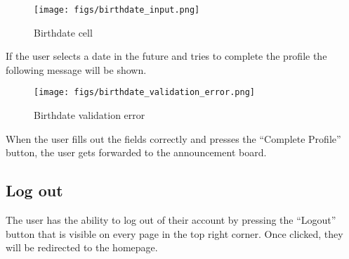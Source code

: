\documentclass[conference]{IEEEtran}
\begin{document}
\begin{enumerate}
    \begin{figure}[H]
    \centering
    \texttt{[image: figs/birthdate\_input.png]}
    \caption{Birthdate cell}
    \label{fig:Birthdate cell}
    \end{figure}
    If the user selects a date in the future and tries to complete the profile the following message will be shown.
    \begin{figure}[H]
    \centering
    \texttt{[image: figs/birthdate\_validation\_error.png]}
    \caption{Birthdate validation error}
    \label{fig:Birthdate cell}
    \end{figure}
    When the user fills out the fields correctly and presses the “Complete Profile” button, the user gets forwarded to the announcement board.
\end{enumerate}
\subsection{Log out}
The user has the ability to log out of their account by pressing the “Logout” button that is visible on every page in the top right corner. Once clicked, they will be redirected to the homepage.
\end{document}

